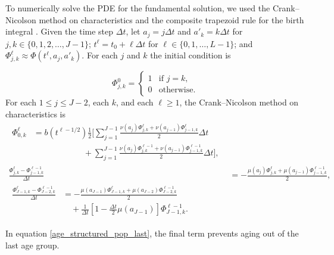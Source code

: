 \documentclass{jpmarticle}
\let\subequationsorig\subequations%
\let\endsubequationsorig\endsubequations%
\renewenvironment{subequations}{
  \subequationsorig
  \renewcommand{\theequation}{\theparentequation.\arabic{equation}}
}{
  \endsubequationsorig
}
\begin{document}
To numerically solve the PDE for the fundamental solution, we used the
Crank--Nicolson method on characteristics and the composite trapezoid
rule for the birth integral \autocite{milner_1992}.  Given the time
step $\Delta t$, let $a_j = j \Delta t$ and $a'_k = k \Delta t$ for
$j, k \in \{0, 1, 2, \ldots, J - 1\}$;
$t^{\ell} = t_0 + \ell \Delta t$ for
$\ell \in \{0, 1, \ldots, L - 1\}$;
and $\Phi_{j, k}^{\ell} \approx \Phi(t^{\ell}, a_j, a'_k)$.
For each $j$ and $k$ the initial condition is
\begin{subequations}
  \begin{equation}
    \Phi_{j, k}^0 =
    \begin{cases}
      1 & \text{if $j = k$}, \\
      0 & \text{otherwise}.
    \end{cases}
  \end{equation}
  For each $1 \leq j \leq J - 2$, each $k$, and each $\ell
  \geq 1$, the Crank--Nicolson method on characteristics is
  \begin{align}
    \begin{split}
      \Phi_{0, k}^{\ell}
      &= b(t^{\ell - 1 / 2})
      \frac{1}{2}
      \Bigg[\sum_{j = 1}^{J - 1}
      \frac{\nu(a_j) \Phi_{j, k}^{\ell}
        + \nu(a_{j - 1}) \Phi_{j - 1, k}^{\ell}}
      {2}
      \Delta t
      \\ & \quad\quad\quad\quad\quad\quad {}
      + \sum_{j = 1}^{J - 1}
      \frac{\nu(a_j) \Phi_{j, k}^{\ell - 1}
        + \nu(a_{j - 1}) \Phi_{j - 1, k}^{\ell - 1}}
      {2}
      \Delta t
      \Bigg],
    \end{split}
    \\
    \frac{\Phi_{j, k}^{\ell} - \Phi_{j - 1, k}^{\ell - 1}}{\Delta t}
    &= - \frac{\mu(a_j) \Phi_{j, k}^{\ell}
      + \mu(a_{j - 1}) \Phi_{j - 1, k}^{\ell - 1}}{2},
    \\
    \begin{split}
      \frac{\Phi_{J - 1, k}^{\ell} - \Phi_{J - 2, k}^{\ell - 1}}{\Delta t}
      &= - \frac{\mu(a_{J - 1}) \Phi_{J - 1, k}^{\ell}
        + \mu(a_{J - 2}) \Phi_{J - 2, k}^{\ell - 1}}{2}
      \\
      & \quad {}
      + \frac{1}{\Delta t}
      \left[1 - \frac{\Delta t}{2} \mu(a_{J - 1})\right]
      \Phi_{J - 1, k}^{\ell - 1}.
    \end{split}
    \label{age_structured_pop_last}
  \end{align}
\end{subequations}
In equation \eqref{age_structured_pop_last}, the final term prevents
aging out of the last age group.
\end{document}

